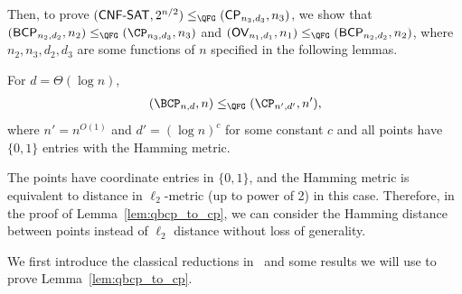 Then, to prove $(\textsf{CNF-SAT}, 2^{n/2})\leq_{\QFG} (\textsf{CP}_{n_3,d_3}, n_3)$, we show that $(\textsf{BCP}_{n_2,d_2},n_2)\leq_{\QFG} (\CP_{n_3,d_3},n_3)$ and $(\textsf{OV}_{n_1,d_1}, n_1) \leq_{\QFG} (\textsf{BCP}_{n_2,d_2},n_2)$, where $n_2, n_3, d_2,d_3$ are some functions of $n$ specified in the following lemmas.

\begin{lemma}\label{lem:qbcp_to_cp}
For $d=\Theta(\log n)$,
\begin{align}
    (\BCP_{n,d},n)\leq_{\QFG} (\CP_{n',d'},n'),
\end{align}
where $n' = n^{O(1)}$ and $d'=(\log n)^{c}$ for some constant $c$ and all points have $\{0,1\}$ entries with the Hamming metric.
\end{lemma}

\begin{remark}
The points have coordinate entries in $\{0,1\}$, and the Hamming metric is equivalent to distance in $\ell_2$-metric (up to power of 2) in this case. Therefore, in the proof of Lemma~\ref{lem:qbcp_to_cp}, we can consider the Hamming distance between points instead of $\ell_2$ distance without loss of generality. 
\end{remark}

We first introduce the classical reductions in~\cite{r29} and some results we will use to prove Lemma~\ref{lem:qbcp_to_cp}. 

